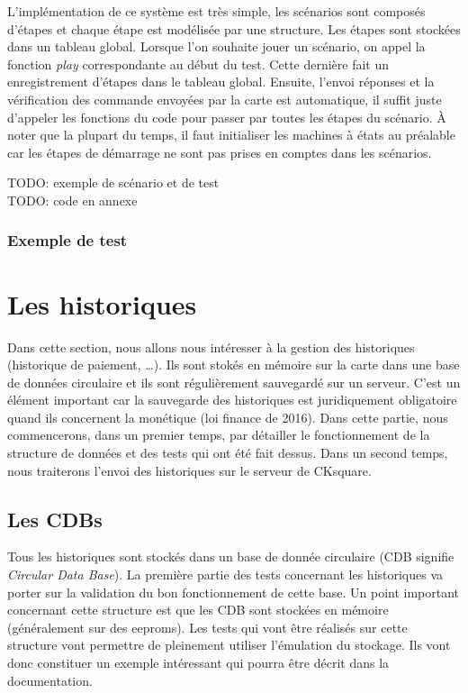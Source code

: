 \documentclass[a4paper]{article}
\begin{document}
L'implémentation de ce système est très simple, les scénarios sont composés
d'étapes et chaque étape est modélisée par une structure. Les étapes sont
stockées dans un tableau global. Lorsque l'on souhaite jouer un scénario, on
appel la fonction \textit{play} correspondante au début du test. Cette dernière
fait un enregistrement d'étapes dans le tableau global. Ensuite, l'envoi
réponses et la vérification des commande envoyées par la carte est automatique,
il suffit juste d'appeler les fonctions du code pour passer par toutes les
étapes du scénario. À noter que la plupart du temps, il faut initialiser les
machines à états au préalable car les étapes de démarrage ne sont pas prises en
comptes dans les scénarios.

TODO: exemple de scénario et de test\\
TODO: code en annexe

\subsubsection{Exemple de test}
\section{Les historiques}%

Dans cette section, nous allons nous intéresser à la gestion des historiques
(historique de paiement, \dots). Ils sont stokés en mémoire sur la carte dans
une base de données circulaire et ils sont régulièrement sauvegardé sur un
serveur. C'est un élément important car la sauvegarde des historiques est
juridiquement obligatoire quand ils concernent la monétique (loi finance de
2016). Dans cette partie, nous commencerons, dans un premier temps, par
détailler le fonctionnement de la structure de données et des tests qui ont
été fait dessus. Dans un second temps, nous traiterons l'envoi des
historiques sur le serveur de CKsquare.

\subsection{Les CDBs}
\label{cdbs}

Tous les historiques sont stockés dans un base de donnée circulaire (CDB
signifie \textit{Circular Data Base}). La première partie des tests concernant
les historiques va porter sur la validation du bon fonctionnement de cette base.
Un point important concernant cette structure est que les CDB sont stockées en
mémoire (généralement sur des eeproms). Les tests qui vont être réalisés sur
cette structure vont permettre de pleinement utiliser l'émulation du stockage.
Ils vont donc constituer un exemple intéressant qui pourra être décrit dans la
documentation.\\
\end{document}
